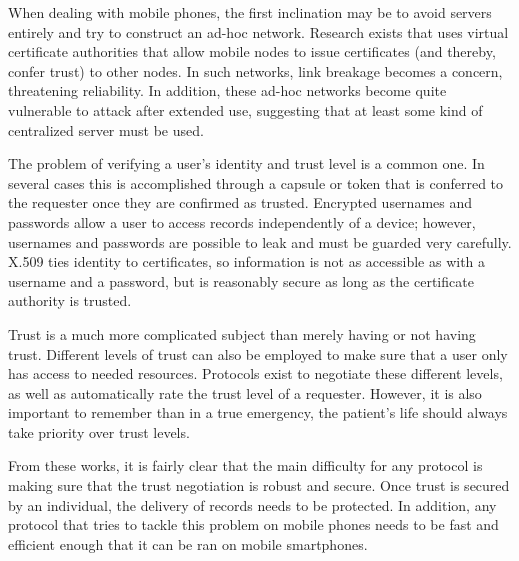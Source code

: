 When dealing with mobile phones, the first inclination may be to avoid servers entirely and try to construct an ad-hoc network. Research exists that uses virtual certificate authorities that allow mobile nodes to issue certificates (and thereby, confer trust) to other nodes. In such networks, link breakage becomes a concern, threatening reliability. In addition, these ad-hoc networks become quite vulnerable to attack after extended use, suggesting that at least some kind of centralized server must be used\cite{5972278}.

The problem of verifying a user's identity and trust level is a common one. In several cases this is accomplished through a capsule or token that is conferred to the requester once they are confirmed as trusted\cite{6040529}\cite{fongen1}\cite{fongen2011federated}. Encrypted usernames and passwords allow a user to access records independently of a device; however, usernames and passwords are possible to leak and must be guarded very carefully\cite{6115545}. X.509 ties identity to certificates, so information is not as accessible as with a username and a password, but is reasonably secure as long as the certificate authority is trusted\cite{4205196}\cite{6115545}\cite{5972278}\cite{fongen2011federated}.

Trust is a much more complicated subject than merely having or not having trust. Different levels of trust can also be employed to make sure that a user only has access to needed resources. Protocols exist to negotiate these different levels, as well as automatically rate the trust level of a requester. However, it is also important to remember than in a true emergency, the patient's life should always take priority over trust levels\cite{6198123}.

From these works, it is fairly clear that the main difficulty for any protocol is making sure that the trust negotiation is robust and secure. Once trust is secured by an individual, the delivery of records needs to be protected. In addition, any protocol that tries to tackle this problem on mobile phones needs to be fast and efficient enough that it can be ran on mobile smartphones.